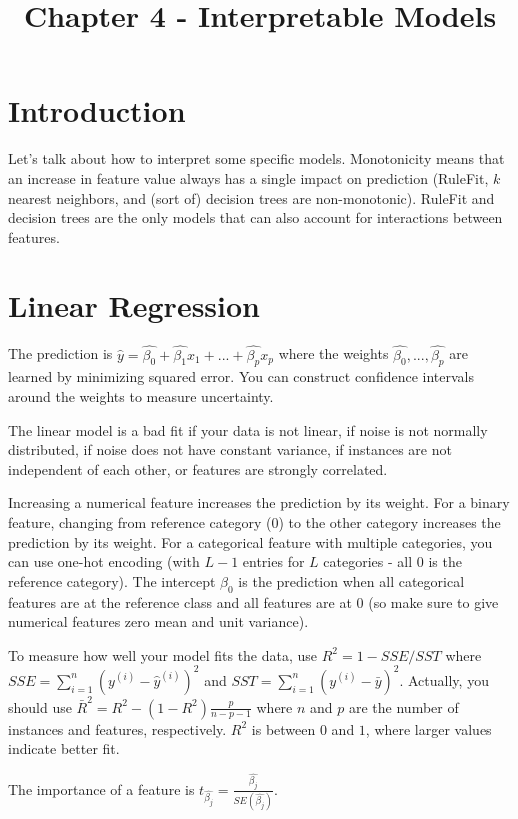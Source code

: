 \documentclass[a4paper]{article}
\title{Chapter 4 - Interpretable Models}
\date{}
\begin{document}
\maketitle

\section{Introduction}
Let's talk about how to interpret some specific models. Monotonicity means that
an increase in feature value always has a single impact on prediction (RuleFit,
$k$ nearest neighbors, and (sort of) decision trees are non-monotonic). RuleFit
and decision trees are the only models that can also account for interactions
between features.

\section{Linear Regression}
The prediction is $\hat{y} = \hat{\beta_0} + \hat{\beta_1} x_1 + ... +
\hat{\beta_p}
x_p$ where the weights $\hat{\beta_0}, ..., \hat{\beta_p}$ are learned by
minimizing squared error. You can construct confidence intervals around the
weights to measure uncertainty.

The linear model is a bad fit if your data is not linear, if noise is
not normally distributed, if noise does not have constant variance, if
instances are not independent of each other, or features are strongly
correlated.

Increasing a numerical feature increases the prediction by its weight. For a
binary feature, changing from reference category (0) to the other category
increases the prediction by its weight. For a categorical feature with multiple
categories, you can use one-hot encoding (with $L - 1$ entries for $L$
categories - all $0$ is the reference category). The intercept $\beta_0$ is the
prediction when all categorical features are at the reference class and all
features are at 0 (so make sure to give numerical features zero mean and unit
variance).

To measure how well your model fits the data, use $R^2 = 1 - SSE / SST$ where $SSE
= \sum_{i=1}^{n}{(y^{(i)} - \hat{y}^{(i)})^2}$ and $SST = \sum_{i=1}^{n}{(y^{(i)} - \bar{y})^2}$. Actually, you should use $\bar{R}^2 = R^2 - (1 - R^2) \frac{p}{
n - p - 1}$ where $n$ and $p$ are the number of instances and features,
respectively. $R^2$ is between $0$ and $1$, where larger values indicate better
fit.

The importance of a feature is $t_{\hat{\beta_j}} = \frac{\hat{\beta_j}}{
SE(\hat{\beta_j})}$.
\end{document}
